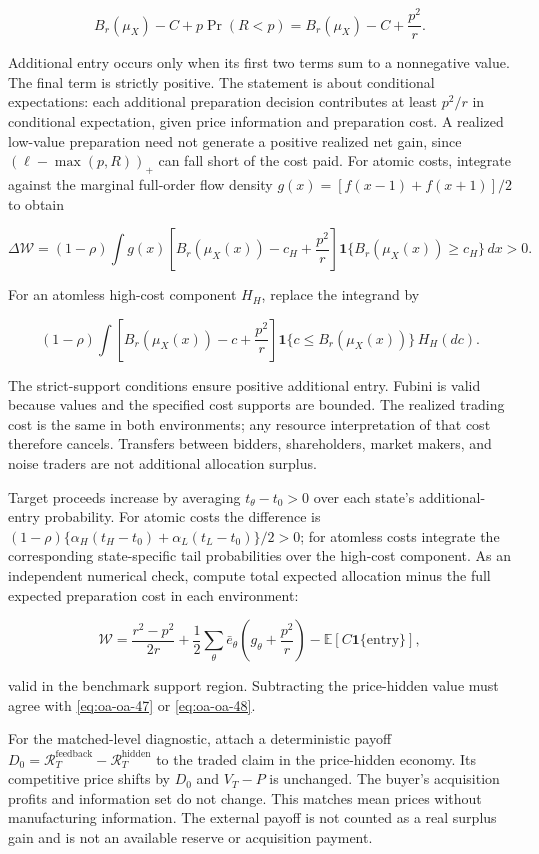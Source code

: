 \documentclass[
  11pt,
]{article}
\begin{document}
\[
B_r(\mu_X)-C+p\Pr(R<p)=B_r(\mu_X)-C+\frac{p^2}{r}.
\tag{OA.46}\label{eq:oa-oa-46}
\]

Additional entry occurs only when its first two terms sum to a
nonnegative value. The final term is strictly positive. The statement is
about conditional expectations: each additional preparation decision
contributes at least \(p^2/r\) in conditional expectation, given price
information and preparation cost. A realized low-value preparation need
not generate a positive realized net gain, since \((\ell-\max(p,R))_+\)
can fall short of the cost paid. For atomic costs, integrate against the
marginal full-order flow density \(g(x)=[f(x-1)+f(x+1)]/2\) to obtain

\[
\Delta\mathcal W=(1-\rho)\int g(x)
\left[B_r(\mu_X(x))-c_H+\frac{p^2}{r}\right]
\mathbf1\{B_r(\mu_X(x))\ge c_H\}\,dx>0.
\tag{OA.47}\label{eq:oa-oa-47}
\]

For an atomless high-cost component \(H_H\), replace the integrand by

\[
(1-\rho)\int\left[B_r(\mu_X(x))-c+\frac{p^2}{r}\right]
\mathbf1\{c\le B_r(\mu_X(x))\}\,H_H(dc).
\tag{OA.48}\label{eq:oa-oa-48}
\]

The strict-support conditions ensure positive additional entry. Fubini
is valid because values and the specified cost supports are bounded. The
realized trading cost is the same in both environments; any resource
interpretation of that cost therefore cancels. Transfers between
bidders, shareholders, market makers, and noise traders are not
additional allocation surplus.

Target proceeds increase by averaging \(t_\theta-t_0>0\) over each
state's additional-entry probability. For atomic costs the difference is
\((1-\rho)\{\alpha_H(t_H-t_0)+\alpha_L(t_L-t_0)\}/2>0\); for atomless
costs integrate the corresponding state-specific tail probabilities over
the high-cost component. As an independent numerical check, compute
total expected allocation minus the full expected preparation cost in
each environment:

\[
\mathcal W=\frac{r^2-p^2}{2r}
+\frac12\sum_\theta\bar e_\theta\left(g_\theta+\frac{p^2}{r}\right)
-\mathbb E[C\mathbf1\{\text{entry}\}],
\tag{OA.49}\label{eq:oa-oa-49}
\]

valid in the benchmark support region. Subtracting the price-hidden
value must agree with \eqref{eq:oa-oa-47} or \eqref{eq:oa-oa-48}.

For the matched-level diagnostic, attach a deterministic payoff
\(D_0=\mathcal R_T^{\mathrm{feedback}}-\mathcal R_T^{\mathrm{hidden}}\)
to the traded claim in the price-hidden economy. Its competitive price
shifts by \(D_0\) and \(V_T-P\) is unchanged. The buyer's acquisition
profits and information set do not change. This matches mean prices
without manufacturing information. The external payoff is not counted as
a real surplus gain and is not an available reserve or acquisition
payment.
\end{document}
